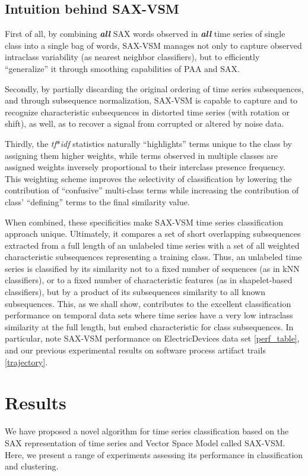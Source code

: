 \documentclass{llncs}
\begin{document}
\subsection{Intuition behind SAX-VSM}
First of all, by combining \textit{\textbf{all}} SAX words observed in \textit{\textbf{all}}
time series of single class into a single bag of words, SAX-VSM manages not only to capture 
observed intraclass variability (as nearest neighbor classifiers), but to efficiently 
``generalize''  it through smoothing capabilities of PAA and SAX.  

Secondly, by partially discarding the original ordering of time series subsequences, and
through subsequence normalization, SAX-VSM is capable to capture and to recognize 
characteristic subsequences in distorted time series (with rotation or shift), as well,
as to recover a signal from corrupted or altered by noise data. 

Thirdly, the \textit{tf$\ast$idf} statistics naturally ``highlights'' terms unique to the
class by assigning them higher weights, while terms observed in multiple classes are 
assigned weights inversely proportional to their interclass presence frequency. 
This weighting scheme improves the selectivity of classification by  lowering the 
contribution of ``confusive'' multi-class terms while increasing  the contribution 
of  class' ``defining'' terms to the final similarity value.   

When combined, these specificities make SAX-VSM time series classification approach 
unique. Ultimately, it compares a set of short overlapping subsequences extracted from a 
full length of an unlabeled time series with a set of all weighted characteristic subsequences
representing a training class.
Thus, an unlabeled time series is classified by its similarity not to a fixed number 
of sequences (as in kNN classifiers), or to a fixed number of characteristic features 
(as in shapelet-based classifiers), but by a product of its subsequences similarity to all 
known subsequences.
This, as we shall show, contributes to the excellent classification performance on temporal 
data sets where time series have a very low intraclass similarity at the full length, but 
embed characteristic for class subsequences. In particular, note SAX-VSM performance 
on ElectricDevices data set \ref{perf_table}, and our previous experimental results on 
software process artifact trails \ref{trajectory}.

\enlargethispage{0.5cm} 
\section{Results}
We have proposed a novel algorithm for time series classification based on the SAX
representation of time series and Vector Space Model called SAX-VSM. Here, we present 
a range of experiments assessing its performance in classification and clustering.
\end{document}
